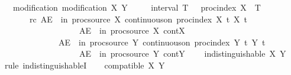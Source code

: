 \begin{isabellebody}
{\ \ \ modification{\isacharcolon}{\kern0pt}\ {\isachardoublequoteopen}modification\ X\ Y{\isachardoublequoteclose}\isanewline
\ \ \ \ \ interval{\isacharcolon}{\kern0pt}\ {\isachardoublequoteopen}{\isasymexists}T\ {\isachargreater}{\kern0pt}\ {}{\isachardot}{\kern0pt}\ proc{\isacharunderscore}{\kern0pt}index\ X\ {\isacharequal}{\kern0pt}\ {\isacharbraceleft}{\kern0pt}{}{\isachardot}{\kern0pt}{\isachardot}{\kern0pt}T{\isacharbraceright}{\kern0pt}{\isachardoublequoteclose}\isanewline
\ \ \ \ \ \ \ rc{\isacharcolon}{\kern0pt}\ {\isachardoublequoteopen}AE\ {\isasymomega}\ in\ proc{\isacharunderscore}{\kern0pt}source\ X{\isachardot}{\kern0pt}\ continuous{\isacharunderscore}{\kern0pt}on\ {\isacharparenleft}{\kern0pt}proc{\isacharunderscore}{\kern0pt}index\ X{\isacharparenright}{\kern0pt}\ {\isacharparenleft}{\kern0pt}{\isasymlambda}t{\isachardot}{\kern0pt}\ X\ t\ {\isasymomega}{\isacharparenright}{\kern0pt}{\isachardoublequoteclose}\isanewline
\ \ \ \ \ \ \ \ \ \ \ \ \ \ \ \ \ \ {\isacharparenleft}{\kern0pt}\ {\isachardoublequoteopen}AE\ {\isasymomega}\ in\ proc{\isacharunderscore}{\kern0pt}source\ X{\isachardot}{\kern0pt}\ {\isacharquery}{\kern0pt}cont{\isacharunderscore}{\kern0pt}X\ {\isasymomega}{\isachardoublequoteclose}{\isacharparenright}{\kern0pt}\isanewline
\ \ \ \ \ \ \ \ \ \ \ \ \ \ {\isachardoublequoteopen}AE\ {\isasymomega}\ in\ proc{\isacharunderscore}{\kern0pt}source\ Y{\isachardot}{\kern0pt}\ continuous{\isacharunderscore}{\kern0pt}on\ {\isacharparenleft}{\kern0pt}proc{\isacharunderscore}{\kern0pt}index\ Y{\isacharparenright}{\kern0pt}\ {\isacharparenleft}{\kern0pt}{\isasymlambda}t{\isachardot}{\kern0pt}\ Y\ t\ {\isasymomega}{\isacharparenright}{\kern0pt}{\isachardoublequoteclose}\isanewline
\ \ \ \ \ \ \ \ \ \ \ \ \ \ \ \ \ \ {\isacharparenleft}{\kern0pt}\ {\isachardoublequoteopen}AE\ {\isasymomega}\ in\ proc{\isacharunderscore}{\kern0pt}source\ Y{\isachardot}{\kern0pt}\ {\isacharquery}{\kern0pt}cont{\isacharunderscore}{\kern0pt}Y\ {\isasymomega}{\isachardoublequoteclose}{\isacharparenright}{\kern0pt}\isanewline
\ \ \ {\isachardoublequoteopen}indistinguishable\ X\ Y{\isachardoublequoteclose}%
}%
%
\isadelimproof
%
\endisadelimproof
%
\isatagproof
{}\isamarkupfalse%
\ {\isacharparenleft}{\kern0pt}rule\ indistinguishableI{\isacharparenright}{\kern0pt}\isanewline
\ \ \isamarkupfalse%
\ {\isachardoublequoteopen}compatible\ X\ Y{\isachardoublequoteclose}\isanewline
\ \ \ \ \isamarkupfalse%

\end{isabellebody}
